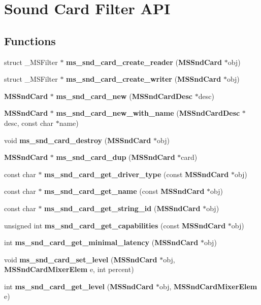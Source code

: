 \section{Sound Card Filter A\-P\-I}
\label{group__mediastreamer2__soundcardfilter}
\subsection*{Functions}
\begin{DoxyCompactItemize}
\item 
struct \-\_\-\-M\-S\-Filter $\ast$ {\bf ms\-\_\-snd\-\_\-card\-\_\-create\-\_\-reader} ({\bf M\-S\-Snd\-Card} $\ast$obj)
\item 
struct \-\_\-\-M\-S\-Filter $\ast$ {\bf ms\-\_\-snd\-\_\-card\-\_\-create\-\_\-writer} ({\bf M\-S\-Snd\-Card} $\ast$obj)
\item 
{\bf M\-S\-Snd\-Card} $\ast$ {\bf ms\-\_\-snd\-\_\-card\-\_\-new} ({\bf M\-S\-Snd\-Card\-Desc} $\ast$desc)
\item 
{\bf M\-S\-Snd\-Card} $\ast$ {\bf ms\-\_\-snd\-\_\-card\-\_\-new\-\_\-with\-\_\-name} ({\bf M\-S\-Snd\-Card\-Desc} $\ast$desc, const char $\ast$name)
\item 
void {\bf ms\-\_\-snd\-\_\-card\-\_\-destroy} ({\bf M\-S\-Snd\-Card} $\ast$obj)
\item 
{\bf M\-S\-Snd\-Card} $\ast$ {\bf ms\-\_\-snd\-\_\-card\-\_\-dup} ({\bf M\-S\-Snd\-Card} $\ast$card)
\item 
const char $\ast$ {\bf ms\-\_\-snd\-\_\-card\-\_\-get\-\_\-driver\-\_\-type} (const {\bf M\-S\-Snd\-Card} $\ast$obj)
\item 
const char $\ast$ {\bf ms\-\_\-snd\-\_\-card\-\_\-get\-\_\-name} (const {\bf M\-S\-Snd\-Card} $\ast$obj)
\item 
const char $\ast$ {\bf ms\-\_\-snd\-\_\-card\-\_\-get\-\_\-string\-\_\-id} ({\bf M\-S\-Snd\-Card} $\ast$obj)
\item 
unsigned int {\bf ms\-\_\-snd\-\_\-card\-\_\-get\-\_\-capabilities} (const {\bf M\-S\-Snd\-Card} $\ast$obj)
\item 
int {\bf ms\-\_\-snd\-\_\-card\-\_\-get\-\_\-minimal\-\_\-latency} ({\bf M\-S\-Snd\-Card} $\ast$obj)
\item 
void {\bf ms\-\_\-snd\-\_\-card\-\_\-set\-\_\-level} ({\bf M\-S\-Snd\-Card} $\ast$obj, {\bf M\-S\-Snd\-Card\-Mixer\-Elem} e, int percent)
\item 
int {\bf ms\-\_\-snd\-\_\-card\-\_\-get\-\_\-level} ({\bf M\-S\-Snd\-Card} $\ast$obj, {\bf M\-S\-Snd\-Card\-Mixer\-Elem} e)

\end{DoxyCompactItemize}
